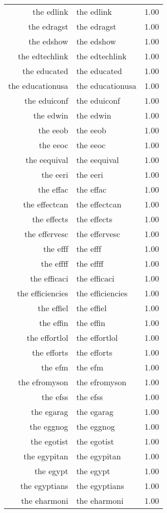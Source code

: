 \begin{table}[ht]
\begin{tabular}{rlr}
  the edlink & the edlink & 1.00 \\ 
  the edragst & the edragst & 1.00 \\ 
  the edshow & the edshow & 1.00 \\ 
  the edtechlink & the edtechlink & 1.00 \\ 
  the educated & the educated & 1.00 \\ 
  the educationusa & the educationusa & 1.00 \\ 
  the eduiconf & the eduiconf & 1.00 \\ 
  the edwin & the edwin & 1.00 \\ 
  the eeob & the eeob & 1.00 \\ 
  the eeoc & the eeoc & 1.00 \\ 
  the eequival & the eequival & 1.00 \\ 
  the eeri & the eeri & 1.00 \\ 
  the effac & the effac & 1.00 \\ 
  the effectcan & the effectcan & 1.00 \\ 
  the effects & the effects & 1.00 \\ 
  the effervesc & the effervesc & 1.00 \\ 
  the efff & the efff & 1.00 \\ 
  the effff & the effff & 1.00 \\ 
  the efficaci & the efficaci & 1.00 \\ 
  the efficiencies & the efficiencies & 1.00 \\ 
  the effiel & the effiel & 1.00 \\ 
  the effin & the effin & 1.00 \\ 
  the effortlol & the effortlol & 1.00 \\ 
  the efforts & the efforts & 1.00 \\ 
  the efm & the efm & 1.00 \\ 
  the efromyson & the efromyson & 1.00 \\ 
  the efss & the efss & 1.00 \\ 
  the egarag & the egarag & 1.00 \\ 
  the eggnog & the eggnog & 1.00 \\ 
  the egotist & the egotist & 1.00 \\ 
  the egypitan & the egypitan & 1.00 \\ 
  the egypt & the egypt & 1.00 \\ 
  the egyptians & the egyptians & 1.00 \\ 
  the eharmoni & the eharmoni & 1.00 \\ 

\end{tabular}
\end{table}
